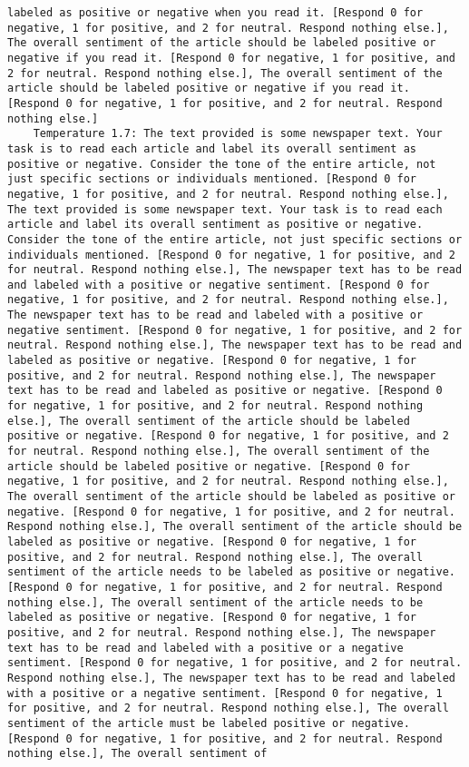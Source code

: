 \begin{lstlisting}[label=lst:poor_performing_prompts]
labeled as positive or negative when you read it. [Respond 0 for negative, 1 for positive, and 2 for neutral. Respond nothing else.], The overall sentiment of the article should be labeled positive or negative if you read it. [Respond 0 for negative, 1 for positive, and 2 for neutral. Respond nothing else.], The overall sentiment of the article should be labeled positive or negative if you read it. [Respond 0 for negative, 1 for positive, and 2 for neutral. Respond nothing else.]
	Temperature 1.7: The text provided is some newspaper text. Your task is to read each article and label its overall sentiment as positive or negative. Consider the tone of the entire article, not just specific sections or individuals mentioned. [Respond 0 for negative, 1 for positive, and 2 for neutral. Respond nothing else.], The text provided is some newspaper text. Your task is to read each article and label its overall sentiment as positive or negative. Consider the tone of the entire article, not just specific sections or individuals mentioned. [Respond 0 for negative, 1 for positive, and 2 for neutral. Respond nothing else.], The newspaper text has to be read and labeled with a positive or negative sentiment. [Respond 0 for negative, 1 for positive, and 2 for neutral. Respond nothing else.], The newspaper text has to be read and labeled with a positive or negative sentiment. [Respond 0 for negative, 1 for positive, and 2 for neutral. Respond nothing else.], The newspaper text has to be read and labeled as positive or negative. [Respond 0 for negative, 1 for positive, and 2 for neutral. Respond nothing else.], The newspaper text has to be read and labeled as positive or negative. [Respond 0 for negative, 1 for positive, and 2 for neutral. Respond nothing else.], The overall sentiment of the article should be labeled positive or negative. [Respond 0 for negative, 1 for positive, and 2 for neutral. Respond nothing else.], The overall sentiment of the article should be labeled positive or negative. [Respond 0 for negative, 1 for positive, and 2 for neutral. Respond nothing else.], The overall sentiment of the article should be labeled as positive or negative. [Respond 0 for negative, 1 for positive, and 2 for neutral. Respond nothing else.], The overall sentiment of the article should be labeled as positive or negative. [Respond 0 for negative, 1 for positive, and 2 for neutral. Respond nothing else.], The overall sentiment of the article needs to be labeled as positive or negative. [Respond 0 for negative, 1 for positive, and 2 for neutral. Respond nothing else.], The overall sentiment of the article needs to be labeled as positive or negative. [Respond 0 for negative, 1 for positive, and 2 for neutral. Respond nothing else.], The newspaper text has to be read and labeled with a positive or a negative sentiment. [Respond 0 for negative, 1 for positive, and 2 for neutral. Respond nothing else.], The newspaper text has to be read and labeled with a positive or a negative sentiment. [Respond 0 for negative, 1 for positive, and 2 for neutral. Respond nothing else.], The overall sentiment of the article must be labeled positive or negative. [Respond 0 for negative, 1 for positive, and 2 for neutral. Respond nothing else.], The overall sentiment of 
\end{lstlisting}
